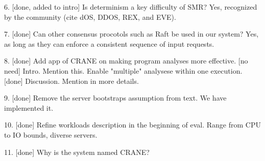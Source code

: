 6. [done, added to intro] Is determinism a key difficulty of SMR? Yes, 
recognized by the community (cite dOS, DDOS, REX, and EVE).

7. [done] Can other consensus procotols such as Raft be used in our system? Yes, as 
long as they can enforce a consistent sequence of input requests.

8. [done] Add app of CRANE on making program analyses more effective.
  [no need] Intro. Mention this. Enable "multiple" analysese within one 
execution.
  [done] Discussion. Mention in more details.
  
9. [done] Remove the server bootstraps assumption from text. We have 
implemented it.

10. [done] Refine workloads description in the beginning of eval. Range from 
CPU to IO bounds, diverse servers.

11. [done] Why is the system named CRANE?
